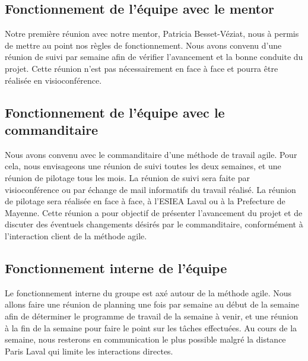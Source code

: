\subsection {Fonctionnement de l'équipe avec le mentor}
Notre première réunion avec notre mentor, Patricia Besset-Véziat, nous à permis de mettre au point nos règles de fonctionnement.
Nous avons convenu d'une réunion de suivi par semaine afin de vérifier l'avancement et la bonne conduite du projet.
Cette réunion n'est pas nécessairement en face à face et pourra être réalisée en visioconférence.


\subsection {Fonctionnement de l'équipe avec le commanditaire}
Nous avons convenu avec le commanditaire d'une méthode de travail agile.
Pour cela, nous envisageons une réunion de suivi toutes les deux semaines, et une réunion de pilotage tous les mois.
La réunion de suivi sera faite par visioconférence ou par échange de mail informatifs du travail réalisé.
La réunion de pilotage sera réalisée en face à face, à l'ESIEA Laval ou à la Prefecture de Mayenne.
Cette réunion a pour objectif de présenter l'avancement du projet et de discuter des éventuels changements désirés par le commanditaire, conformément à l'interaction client de la méthode agile.


\subsection {Fonctionnement interne de l'équipe}
Le fonctionnement interne du groupe est axé autour de la méthode agile.
Nous allons faire une réunion de planning une fois par semaine au début de la semaine afin de déterminer le programme de travail de la semaine à venir, et une réunion à la fin de la semaine pour faire le point sur les tâches effectuées.
Au cours de la semaine, nous resterons en communication le plus possible malgré la distance Paris Laval qui limite les interactions directes.


